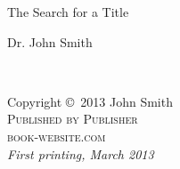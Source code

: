 \documentclass[11pt,fleqn]{book} %
\begin{document}

\begingroup
\thispagestyle{empty}
\centering
\vspace*{9cm}
\par\normalfont\fontsize{35}{35}\sffamily\selectfont
The Search for a Title\par %
\vspace*{1cm}
{\Huge Dr. John Smith}\par %
\endgroup


\newpage
~\vfill
\thispagestyle{empty}

\noindent Copyright \copyright\ 2013 John Smith\\ %

\noindent \textsc{Published by Publisher}\\ %

\noindent \textsc{book-website.com}\\ %


\noindent \textit{First printing, March 2013} %


\end{document}
